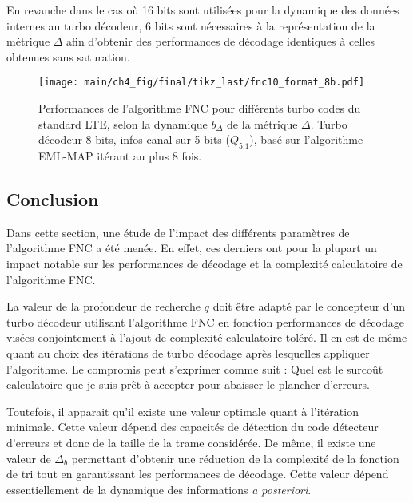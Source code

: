 En revanche dans le cas où 16 bits sont utilisées pour la dynamique des données internes au turbo décodeur, 6 bits sont 
nécessaires à la représentation de la métrique $\Delta$ afin d'obtenir des performances de décodage identiques à celles obtenues sans saturation.

\begin{figure}[!t]
	\hspace*{-.075\textwidth}
	\texttt{[image: main/ch4\_fig/final/tikz\_last/fnc10\_format\_8b.pdf]}
	\caption{Performances de l'algorithme FNC pour différents turbo codes du standard LTE, selon la dynamique $b_{\Delta}$ 
	de la métrique $\Delta$.
	Turbo décodeur 8 bits, infos canal sur 5 bits ($Q_{5.1}$), basé sur l'algorithme EML-MAP itérant au plus 8 fois.
	\label{fig:fnc_format_8b}}
\end{figure}


\subsection{Conclusion}
Dans cette section, une étude de l'impact des différents paramètres de l'algorithme FNC a été menée. En effet, ces derniers ont
pour la plupart un impact notable sur les performances de décodage et la complexité calculatoire de l'algorithme FNC. 

La valeur de la profondeur de recherche $q$ doit être adapté par le concepteur d'un turbo décodeur utilisant l'algorithme 
FNC en fonction performances de décodage visées conjointement à l'ajout de complexité calculatoire toléré. Il en est de même 
quant au choix des itérations de turbo décodage après lesquelles appliquer l'algorithme. Le compromis peut s'exprimer comme
suit : \og Quel est le surcoût calculatoire que je suis prêt à accepter pour abaisser le plancher d'erreurs. \fg

Toutefois, il apparait qu'il existe une valeur optimale quant à l’itération minimale. Cette valeur dépend des capacités 
de détection du code détecteur d'erreurs et donc de la taille de la trame considérée. De même, il existe une valeur de 
$\Delta_b$ permettant d'obtenir une réduction de la complexité de la fonction de tri tout en garantissant les performances de 
décodage. Cette valeur dépend essentiellement de la dynamique des informations \textit{a posteriori}.

